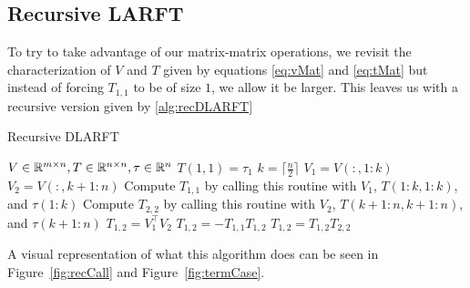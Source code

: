 \documentclass[12pt]{article}
\begin{document}
    \subsection{Recursive LARFT}
    To try to take advantage of our matrix-matrix operations, we revisit the characterization of $V$ and $T$
    given by equations \ref{eq:vMat} and \ref{eq:tMat} but instead of forcing $T_{1,1}$ to be of size $1$, we 
    allow it be larger. This leaves us with a recursive version given by \ref{alg:recDLARFT}
    
    \begin{algorithm}
        \caption{Recursive DLARFT}\label{alg:recDLARFT}
        \begin{algorithmic}[1]
            \REQUIRE $V\in\mathbb{R}^{m\times n}, T\in\mathbb{R}^{n\times n}, \tau\in\mathbb{R}^n$\hfill{}
                \STATE $T(1,1) = \tau_1$
                \RETURN
            \ENDIF
            \STATE $k = \lceil\frac{n}{2}\rceil$%
            \STATE $V_1 = V(:,1:k)$
            \STATE $V_2 = V(:,k+1:n)$
            \STATE Compute $T_{1,1}$ by calling this routine with $V_1$, $T(1:k,1:k)$, and $\tau(1:k)$
            \STATE Compute $T_{2,2}$ by calling this routine with $V_2$, $T(k+1:n,k+1:n)$, and $\tau(k+1:n)$
            \STATE $T_{1,2} = V_1^\top V_2$
            \STATE $T_{1,2} = -T_{1,1}T_{1,2}$
            \STATE $T_{1,2} = T_{1,2}T_{2,2}$
            \RETURN
        \end{algorithmic}
    \end{algorithm}

    A visual representation of what this algorithm does can be seen in Figure~\ref{fig:recCall} and Figure~\ref{fig:termCase}.
\end{document}
